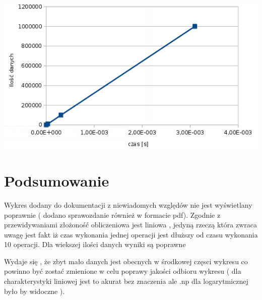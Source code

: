 \begin{DoxyImageNoCaption}
  \mbox{\includegraphics[width=\textwidth,height=\textheight/2,keepaspectratio=true]{1.jpg}}
\end{DoxyImageNoCaption}
\hypertarget{_sprawozdanie_Podsumowanie}{}\section{Podsumowanie}\label{_sprawozdanie_Podsumowanie}
\begin{DoxyVerb} Wykres dodany do dokumentacji z niewiadomych względów nie jest wyświetlany poprawnie ( dodano sprawozdanie również w formacie pdf).
 Zgodnie z przewidywaniami złożoność obliczeniowa jest liniowa , jedyną rzeczą która zwraca uwagę jest fakt iż czas wykonania jednej operacji jest dłuższy od czasu wykonania 10 operacji. Dla wiekszej ilości danych wyniki są poprawne
\end{DoxyVerb}
 Wydaje się , że zbyt mało danych jest obecnych w środkowej częsci wykresu co powinno być zostać zmienione w celu poprawy jakości odbioru wykresu ( dla charakterystyki liniowej jest to akurat bez znaczenia ale .np dla logarytmicznej było by widoczne ). 